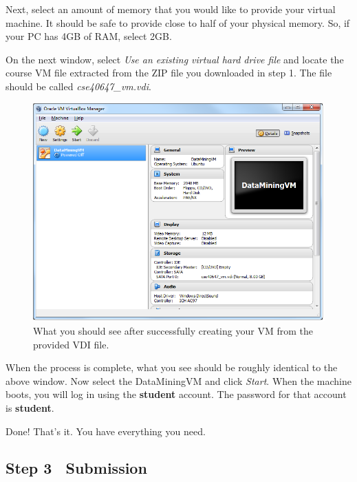 \documentclass[paper=a4, fontsize=11pt]{scrartcl} %
\numberwithin{equation}{section} %
\numberwithin{figure}{section} %
\numberwithin{table}{section} %
\begin{document}
Next, select an amount of memory that you would like to provide your virtual machine. It should be safe to provide close to half of your physical memory. So, if your PC has 4GB of RAM, select 2GB.

\vspace{12pt}

On the next window, select \textit{Use an existing virtual hard drive file} and locate the course VM file extracted from the ZIP file you downloaded in step 1. The file should be called \textit{cse40647\_vm.vdi}.

\vspace{5pt}
\begin{figure}[h]
    \centering
	\includegraphics[scale=0.6]{img1.png}
	\caption{What you should see after successfully creating your VM from the provided VDI file.}
\end{figure}

\vspace{12pt}

When the process is complete, what you see should be roughly identical to the above window. Now select the DataMiningVM and click \textit{Start}. When the machine boots, you will log in using the \textbf{student} account. The password for that account is \textbf{student}.

\vspace{8pt}

Done! That's it. You have everything you need.

\vspace{8pt}
\subsection*{Step 3 \textemdash~Submission}
\end{document}
